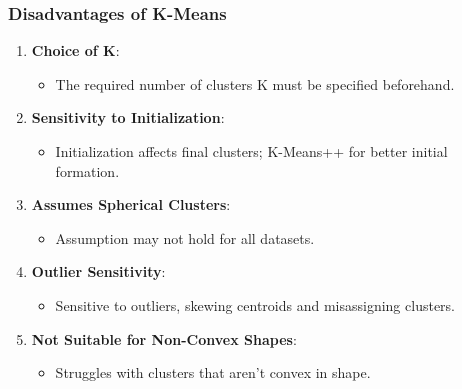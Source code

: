 \documentclass{beamer}
\begin{document}
\begin{frame}[fragile]
    \frametitle{Disadvantages of K-Means}
    \begin{enumerate}
        \item \textbf{Choice of K}:
            \begin{itemize}
                \item The required number of clusters K must be specified beforehand.
            \end{itemize}

        \item \textbf{Sensitivity to Initialization}:
            \begin{itemize}
                \item Initialization affects final clusters; K-Means++ for better initial formation.
            \end{itemize}

        \item \textbf{Assumes Spherical Clusters}:
            \begin{itemize}
                \item Assumption may not hold for all datasets.
            \end{itemize}

        \item \textbf{Outlier Sensitivity}:
            \begin{itemize}
                \item Sensitive to outliers, skewing centroids and misassigning clusters.
            \end{itemize}

        \item \textbf{Not Suitable for Non-Convex Shapes}:
            \begin{itemize}
                \item Struggles with clusters that aren't convex in shape.
            \end{itemize}
    \end{enumerate}
\end{frame}
\end{document}
